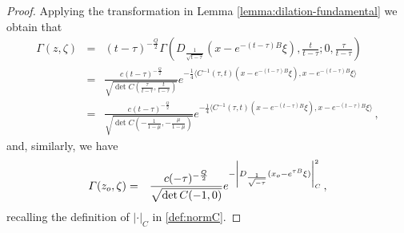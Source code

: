 \documentclass[10pt,a4paper]{amsart}
\renewcommand{\Gamma}{\varGamma}
\begin{document}
\begin{proof} 
Applying the  transformation in Lemma \ref{lemma:dilation-fundamental} we obtain that 
\begin{eqnarray*}
  \Gamma(z,\zeta)  & = & (t-\tau)^{-\frac{Q}{2}} \Gamma(D_{\frac{1}{\sqrt{t-\tau}}}(x-e^{-(t-\tau)B}\xi),\frac{t}{t-\tau};0,\frac{\tau}{t-\tau})\\
  & = & \frac{c(t-\tau)^{-\frac{Q}{2}}}{\sqrt{\det C(\frac{\tau}{t-\tau},\frac{t}{t-\tau})}}e^{-\frac{1}{4}\langle C^{-1}(\tau,t)(x-e^{-(t-\tau)B}\xi),x-e^{-(t-\tau)B}\xi\rangle}\\
   & = & \frac{c(t-\tau)^{-\frac{Q}{2}}}{\sqrt{\det C(-\frac{1}{1-\mu},-\frac{\mu}{1-\mu})}}e^{-\frac{1}{4}\langle C^{-1}(\tau,t)(x-e^{-(t-\tau)B}\xi),x-e^{-(t-\tau)B}\xi\rangle}\,,
\end{eqnarray*}
and, similarly, we have
\begin{eqnarray*}
    \Gamma(z_{\rm o},\zeta) &=&\frac{c(-\tau)^{-\frac{Q}{2}}}{\sqrt{\det C(-1,0)}}e^{-\left|D_{\frac{1}{\sqrt{-\tau}}}(x_{\rm o}-e^{\tau B}\xi)\right|_C^2}\,,
\end{eqnarray*}
recalling the definition of $|\cdot|_C$ in \eqref{def:normC}. 


\end{proof}
\end{document}
